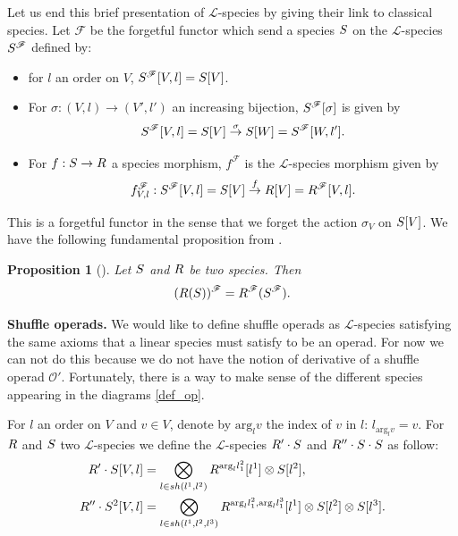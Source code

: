 \documentclass[11pt]{article}
\newtheorem{prop}[theo]{Proposition}
\theoremstyle{definition}
\numberwithin{equation}{section}
\newcommand{\spe}[1]{\normalfont{\textsc{#1}}}
\newcommand{\Operad}{\mathcal{O}}
\begin{document}
Let us end this brief presentation of $\mathscr{L}$-species by giving their link to classical species. Let $\mathscr{F}$ be the forgetful functor which send a  
species $\spe{S}$ on the $\mathscr{L}$-species $\spe{S}^{\mathscr{F}}$ defined by:
\begin{itemize}
    \item for $l$ an order on $V$, $\spe{S}^{\mathscr{F}}[V,l]=\spe{S}[V]$. 
    \item For $\sigma:(V,l)\to (V',l')$ an increasing bijection, $\spe{S}^{\mathscr{F}}[\sigma]$ is given by
    \begin{equation}
        \spe{S}^{\mathscr{F}}[V,l]=\spe{S}[V] \stackrel{\sigma}{\to} \spe{S}[W]= \spe{S}^{\mathscr{F}}[W,l'].
    \end{equation}
    \item For $f:\spe{S}\to\spe{R}$ a species morphism, $f^{\mathscr{F}}$ is the $\mathscr{L}$-species morphism given by
        \begin{equation}
        f^{\mathscr{F}}_{V,l}:\spe{S}^{\mathscr{F}}[V,l]= \spe{S}[V] \stackrel{f}{\to} \spe{R}[V]= \spe{R}^{\mathscr{F}}[V,l].
    \end{equation}
\end{itemize}
This is a forgetful functor in the sense that we forget the action $\sigma_V$ on $\spe{S}[V]$. We have the following fundamental proposition from
\cite{DK10}.

\begin{prop}[{\cite[Proposition 3]{DK10}}]\label{prop_dk10}
    Let $\spe{S}$ and $\spe{R}$ be two species. Then 
    \begin{equation}
        (\spe{R}(\spe{S}))^{\mathscr{F}}=\spe{R}^\mathscr{F}(\spe{S}^\mathscr{F}).
    \end{equation}
\end{prop}


\noindent\textbf{Shuffle operads.} We would like to define shuffle operads as $\mathscr{L}$-species satisfying the same axioms that a linear species must satisfy to be an operad. For now we can
not do this because we do not have the notion of derivative of a shuffle operad $\Operad'$. Fortunately, there is a way to make sense of the different 
species appearing in the diagrams \eqref{def_op}. 

For $l$ an order on $V$ and $v\in V$, denote by $\text{arg}_lv$ the index of $v$ in $l$: $l_{\text{arg}_lv}=v$. 
For $\spe{R}$ and $\spe{S}$ two $\mathscr{L}$-species we define the $\mathscr{L}$-species $\spe{R}'\cdot\spe{S}$ and $\spe{R}''\cdot\spe{S}\cdot\spe{S}$ as follow:
\begin{equation}\begin{split}
    \spe{R}'\cdot\spe{S}[V,l] &= \bigotimes_{l\in sh(l^1,l^2)} \spe{R}^{\text{arg}_l l_1^2}[l^1]\otimes\spe{S}[l^2], \\
    \spe{R}''\cdot\spe{S}^2[V,l] &= \bigotimes_{l\in sh(l^1,l^2,l^3)} \spe{R}^{\text{arg}_l l^2_1, \text{arg}_l l^3_1}[l^1]\otimes\spe{S}[l^2]\otimes\spe{S}[l^3].
\end{split}\end{equation}
\end{document}
